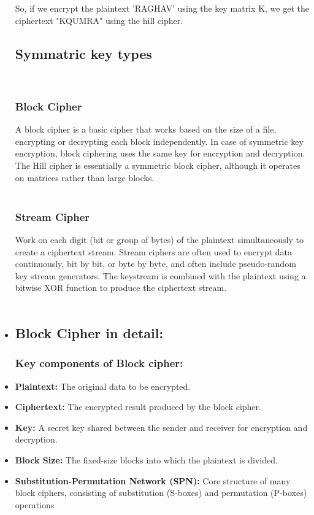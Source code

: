 \documentclass[11pt]{article}
\begin{document}
\begin{itemize}
So, if we encrypt the plaintext 'RAGHAV' using the key matrix K, we get the ciphertext "KQUMRA" using the hill cipher.\\

 \subsection{Symmatric key types}
\\
\subsubsection{Block Cipher}A block cipher is a basic cipher that works based on the size of a file, encrypting or decrypting each block independently. In case of symmetric key encryption, block ciphering uses the same key for encryption and decryption. The Hill cipher is essentially a symmetric block cipher, although it operates on matrices rather than large blocks.
\\\\
\subsubsection{Stream Cipher}Work on each digit (bit or group of bytes) of the plaintext simultaneously to create a ciphertext stream. Stream ciphers are often used to encrypt data continuously, bit by bit, or byte by byte, and often include pseudo-random key stream generators. The keystream is combined with the plaintext using a bitwise XOR function to produce the ciphertext stream.
\\\\

    \item \subsection{Block Cipher in detail:}
    \subsubsection{Key components of Block cipher:}
    
 \item \textbf{Plaintext:} The original data to be encrypted.\\
        \item \textbf{Ciphertext:} The encrypted result produced by the block cipher.\\
        \item \textbf{Key:} A secret key shared between the sender and receiver for encryption and decryption.\\
        \item \textbf{Block Size:} The fixed-size blocks into which the plaintext is divided.\\
        \item \textbf{Substitution-Permutation Network (SPN):} Core structure of many block ciphers, consisting of substitution (S-boxes) and permutation (P-boxes) operations\\\\


\end{itemize}
\end{document}
